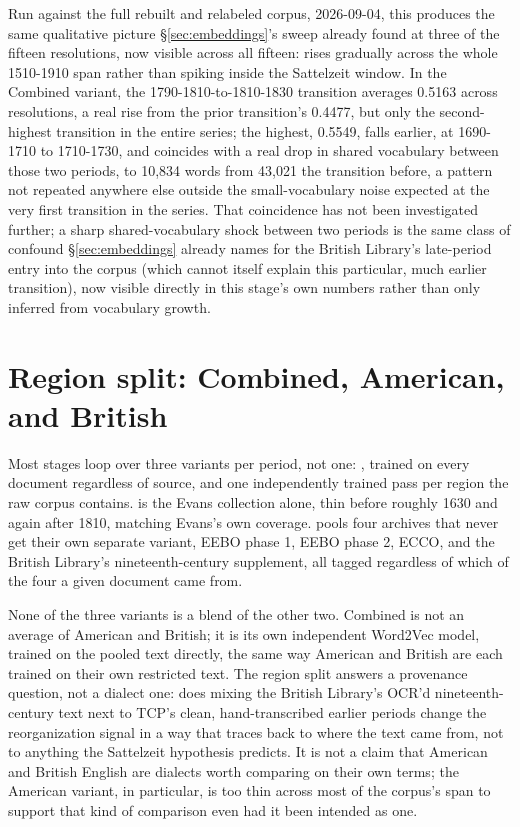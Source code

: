 \documentclass[11pt]{article}
\begin{document}
Run against the full rebuilt and relabeled corpus, 2026-09-04, this
produces the same qualitative picture \S\ref{sec:embeddings}'s sweep
already found at three of the fifteen resolutions, now visible across
all fifteen:  rises gradually across the whole
1510-1910 span rather than spiking inside the Sattelzeit window. In the
Combined variant, the 1790-1810-to-1810-1830 transition averages 0.5163
across resolutions, a real rise from the prior transition's 0.4477, but
only the second-highest transition in the entire series; the highest,
0.5549, falls earlier, at 1690-1710 to 1710-1730, and coincides with a
real drop in shared vocabulary between those two periods, to 10{,}834
words from 43{,}021 the transition before, a pattern not repeated
anywhere else outside the small-vocabulary noise expected at the very
first transition in the series. That coincidence has not been
investigated further; a sharp shared-vocabulary shock between two
periods is the same class of confound \S\ref{sec:embeddings} already
names for the British Library's late-period entry into the corpus
(which cannot itself explain this particular, much earlier transition),
now visible directly in this stage's own numbers rather than only
inferred from vocabulary growth.

\section{Region split: Combined, American, and British}
\label{sec:regions}

Most stages loop over three variants per period, not one:
, trained on every document regardless of source, and one
independently trained pass per region the raw corpus contains.
 is the Evans collection alone, thin before roughly 1630
and again after 1810, matching Evans's own coverage. 
pools four archives that never get their own separate variant, EEBO
phase 1, EEBO phase 2, ECCO, and the British Library's nineteenth-century
supplement, all tagged  regardless of which of the four a
given document came from.

None of the three variants is a blend of the other two. Combined is not
an average of American and British; it is its own independent Word2Vec
model, trained on the pooled text directly, the same way American and
British are each trained on their own restricted text. The region split
answers a provenance question, not a dialect one: does mixing the
British Library's OCR'd nineteenth-century text next to TCP's clean,
hand-transcribed earlier periods change the reorganization signal in a
way that traces back to where the text came from, not to anything the
Sattelzeit hypothesis predicts. It is not a claim that American and
British English are dialects worth comparing on their own terms; the
American variant, in particular, is too thin across most of the corpus's
span to support that kind of comparison even had it been intended as
one.
\end{document}
